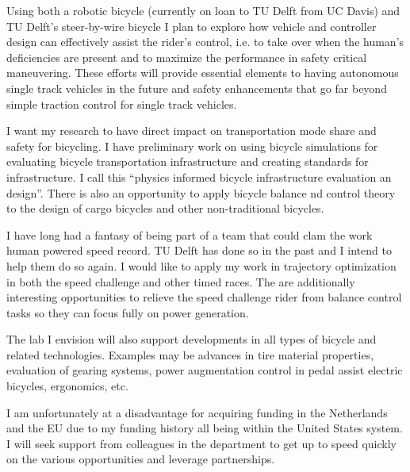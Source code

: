 \documentclass{article}
\begin{document}
Using both a robotic bicycle (currently on loan to TU Delft from UC Davis) and
TU Delft's steer-by-wire bicycle I plan to explore how vehicle and controller
design can effectively assist the rider's control, i.e. to take over when the
human's deficiencies are present and to maximize the performance in safety
critical maneuvering. These efforts will provide essential elements to having
autonomous single track vehicles in the future and safety enhancements that go
far beyond simple traction control for single track vehicles.

I want my research to have direct impact on transportation mode share and
safety for bicycling. I have preliminary work on using bicycle simulations for
evaluating bicycle transportation infrastructure and creating standards for
infrastructure. I call this ``physics informed bicycle infrastructure
evaluation an design''. There is also an opportunity to apply bicycle balance
nd control theory to the design of cargo bicycles and other non-traditional
bicycles.

I have long had a fantasy of being part of a team that could clam the work
human powered speed record. TU Delft has done so in the past and I intend to
help them do so again. I would like to apply my work in trajectory optimization
in both the speed challenge and other timed races. The are additionally
interesting opportunities to relieve the speed challenge rider from balance
control tasks so they can focus fully on power generation.

The lab I envision will also support developments in all types of bicycle and
related technologies. Examples may be advances in tire material properties,
evaluation of gearing systems, power augmentation control in pedal assist
electric bicycles, ergonomics, etc.

I am unfortunately at a disadvantage for acquiring funding in the Netherlands
and the EU due to my funding history all being within the United States system.
I will seek support from colleagues in the department to get up to speed
quickly on the various opportunities and leverage partnerships.




\end{document}
